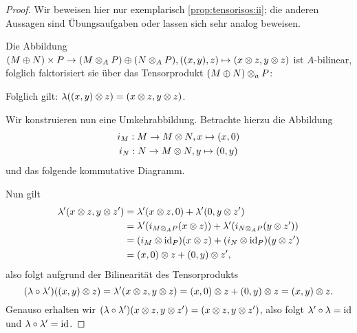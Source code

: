 \documentclass[12pt,a4paper]{scrartcl}
\theoremstyle{cplain}
\theoremstyle{cdef}
\begin{document}
\begin{proof}
	Wir beweisen hier nur exemplarisch \ref{prop:tensorisos:ii}; die anderen Aussagen sind Übungsaufgaben oder lassen sich sehr analog beweisen.

	\bigskip
	
	Die Abbildung $(M\oplus N)\times P \to (M\otimes_AP) \oplus(N\otimes_AP), ((x,y),z)\mapsto (x\otimes z, y\otimes z)$ ist $A$-bilinear, folglich faktorisiert sie über das Tensorprodukt $(M\oplus N)\otimes_aP$:
	\begin{center}
	\end{center}
	Folglich gilt: $\lambda((x,y)\otimes z) = (x\otimes z, y\otimes z)$.

	Wir konstruieren nun eine Umkehrabbildung. Betrachte hierzu die Abbildung
	\begin{gather*}
		i_M: M \to M \otimes N, x \mapsto (x,0) \\
		i_N : N \to M \otimes N, y \mapsto (0,y)
	\end{gather*}
	und das folgende kommutative Diagramm.
	\begin{center}
	\end{center}
	Nun gilt
	\begin{align*}
		\lambda'(x \otimes z, y \otimes z') &= \lambda'(x \otimes z,0)+ \lambda'(0,y \otimes z') \\
		&= \lambda'(i_{M \otimes_A P}(x \otimes z))+ \lambda'(i_{N \otimes_A P}(y \otimes z')) \\
		&= (i_M \otimes \operatorname{id}_P)(x \otimes z) + (i_N \otimes \operatorname{id}_P)(y \otimes z') \\
		&= (x,0) \otimes z + (0,y) \otimes z',
	\end{align*}
	also folgt aufgrund der Bilinearität des Tensorprodukts \[ (\lambda \circ \lambda')((x,y)\otimes z) = \lambda'(x \otimes z, y \otimes z) = (x,0) \otimes z + (0,y) \otimes z = (x,y)\otimes z .\]
	Genauso erhalten wir $(\lambda \circ \lambda')(x \otimes z,y \otimes z') = (x\otimes z, y \otimes z')$, also folgt $\lambda' \circ \lambda = \operatorname{id}$ und $\lambda \circ \lambda' = \operatorname{id}$.
\end{proof}
\end{document}
